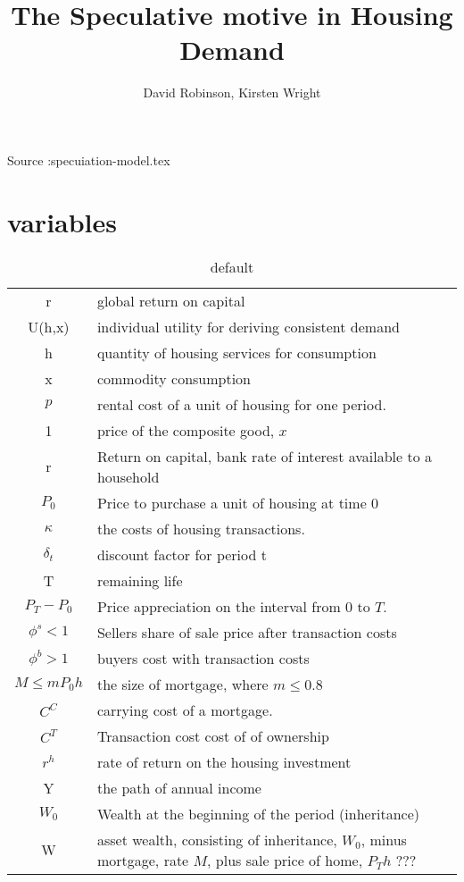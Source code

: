 \documentclass[11pt]{amsart}
\title{The Speculative motive in Housing Demand}
\author{David Robinson, Kirsten Wright}
\begin{document}
\maketitle
Source :specuiation-model.tex
\section{variables}


\begin{table}[htp]
\caption{default}
\begin{center}
\begin{tabular}{cp{8cm}}
r& global return on capital\\
U(h,x)  & individual utility for deriving consistent demand\\
 h	 &quantity of housing services for consumption \\
x     	&commodity consumption\\
$p$ 	& rental cost of a unit of housing for one period. \\%
 1			&price of the composite good, $x$\\ 
 r			& Return on capital, bank rate of interest available to a household\\
$P_{0}$ 		& Price to purchase a unit of housing at time $0$ \\
 $\kappa$ & the costs of housing transactions.\\
 $\delta_t$& discount factor for period t\\
T 			& remaining life\\
 $P_T-P_0$	&Price appreciation on the interval from 0 to $T$.\\
$\phi^s<1$	&Sellers share of sale price after transaction costs\\
$\phi^b>1$	&buyers cost with transaction costs\\
 $M\leq mP_0h$ 	&the size of mortgage, where $m\leq 0.8$\\
$C^C $&carrying cost of a mortgage. \\
$C^T$&Transaction cost cost of of ownership \\
$r^h$&rate of  return on the housing investment\\	
  Y & the path of annual income\\
$W_0$& Wealth at the beginning of the period (inheritance)\\
W&asset wealth, consisting of inheritance, $W_0$, minus mortgage, rate $M$,  plus sale price of home,  $P_Th$  ??? \\
\end{tabular}
\end{center}
\label{default}
\end{table}%
\end{document}
